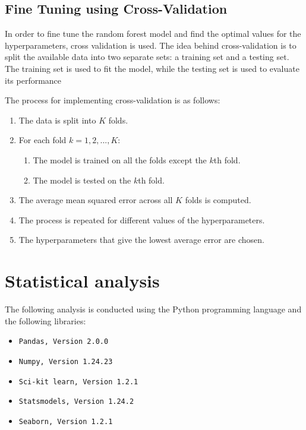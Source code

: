 \documentclass[12 pt]{scrartcl}
\numberwithin{equation}{section}
\begin{document}
\subsection{Fine Tuning using Cross-Validation}
\label{subsec:Fine Tuning using Cross-Validation}

In order to fine tune the random forest model and find the optimal values for the hyperparameters, cross validation is used.
The idea behind cross-validation is to split the available data into two separate sets: a training set and a testing set. 
The training set is used to fit the model, while the testing set is used to evaluate its performance \citep[p.291]{stat-learning}

The process for implementing cross-validation is as follows:

\begin{enumerate}
    \item The data is split into $K$ folds.
    \item For each fold $k = 1,2,...,K$:
    \begin{enumerate}
        \item The model is trained on all the folds except the $k$th fold.
        \item The model is tested on the $k$th fold.
    \end{enumerate}
    \item The average mean squared error across all $K$ folds is computed.
    \item The process is repeated for different values of the hyperparameters.
    \item The hyperparameters that give the lowest average error are chosen.
\end{enumerate}


\section{Statistical analysis}
\label{sec:Statistical analysis}

The following analysis is conducted using the Python programming language and the following libraries:

\begin{itemize}
    \item \texttt{Pandas, Version 2.0.0} \citep{pandas}
    \item \texttt{Numpy, Version 1.24.23} \citep{numpy}
    \item \texttt{Sci-kit learn, Version 1.2.1} \citep{scikit-learn}
    \item \texttt{Statsmodels, Version 1.24.2} \citep{statmodels}
    \item \texttt{Seaborn, Version 1.2.1} \citep{seaborn}
\end{itemize}
\end{document}
